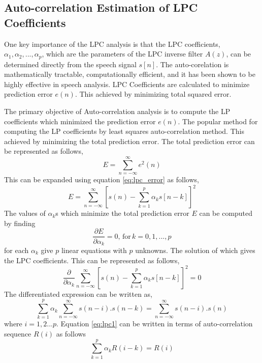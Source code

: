 \documentclass[12pt, a4paper, twoside]{report}
\begin{document}
\subsection{Auto-correlation Estimation of LPC Coefficients}
One key importance of the LPC analysis is that the LPC coefficients, $\alpha_1, \alpha_2, ..., \alpha_p$, which are the parameters of the LPC inverse filter $A(z)$, can be determined directly from the speech signal $s[n]$. The auto-corelation is mathematically tractable, computationally efficient, and it has been shown to be highly effective in speech analysis. LPC Coefficients are calculated to minimize prediction error $e(n)$. This achieved by minimizing total squared error.

The primary objective of Auto-correlation analysis is to compute the LP coefficients which minimized the prediction error $e(n)$. The popular method for computing the LP coefficients by least squares auto-correlation method. This achieved by minimizing the total prediction error. The total prediction error can be represented as follows,
\begin{equation}
E = \sum^{\infty}_{n=-\infty} e^2(n)
\end{equation}
This can be expanded using equation \ref{eq:lpc_error} as follows,
\begin{equation}
E = \sum_{n=-\infty}^{\infty} \left [ s(n) - \sum_{k=1}^{p}\alpha_k s[n-k] \right ]^{2}
\end{equation}
The values of $\alpha_k$s which minimize the total prediction error $E$ can be computed by finding
\begin{equation}
\frac{\partial E}{\partial \alpha_k} = 0, \, \text{for} \, k = 0,1,...,p
\end{equation}
for each $\alpha_k$ give $p$ linear equations with $p$ unknowns. The solution of which gives the LPC coefficients. This can be represented as follows,
\begin{equation}
\frac{\partial}{\partial \alpha_k} \sum_{n=-\infty}^{\infty} \left [ s(n) - \sum_{k=1}^{p}\alpha_k s[n-k] \right ]^{2} = 0
\end{equation}
The differentiated expression can be written as,
\begin{equation}
\sum_{k=1}^{p} \alpha_k \sum_{n=-\infty }^{\infty } s(n-i).s(n-k) = \sum_{n=-\infty }^{\infty } s(n-i).s(n)
\label{eq:lpc1}
\end{equation}
where $i=1, 2...p$. Equation \ref{eq:lpc1} can be written in terms of auto-correlation sequence $R(i)$ as follows
\begin{equation}
\sum_{k=1}^{p} \alpha_k R(i-k) = R(i)
\end{equation}
\end{document}
